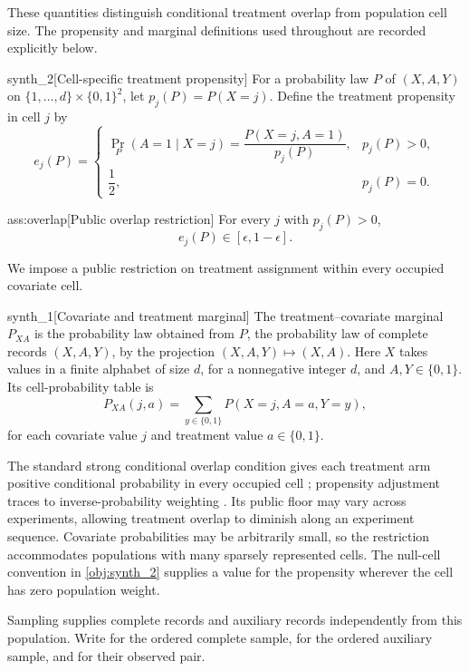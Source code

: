\documentclass[11pt]{article}
\begin{document}
These quantities distinguish conditional treatment overlap from population cell size. The propensity and marginal definitions used throughout are recorded explicitly below.

\begin{definitionv}{synth_2}[Cell-specific treatment propensity]
For a probability law \(P\) of \((X,A,Y)\) on \(\{1,\ldots,d\}\times\{0,1\}^2\), let \(p_j(P)=P(X=j)\). Define the treatment propensity in cell \(j\) by
\[
e_j(P)=
\begin{cases}
\Pr_P(A=1\mid X=j)
=\dfrac{P(X=j,A=1)}{p_j(P)},&p_j(P)>0,\\[6pt]
\dfrac12,&p_j(P)=0.
\end{cases}
\]
\end{definitionv}

\begin{assumptionv}{ass:overlap}[Public overlap restriction]
For every \(j\) with \(p_j(P)>0\),
\[
e_j(P)\in[\epsilon,1-\epsilon].
\]
\end{assumptionv}

We impose a public restriction on treatment assignment within every occupied covariate cell.

\begin{definitionv}{synth_1}[Covariate and treatment marginal]
The treatment–covariate marginal \(P_{XA}\) is the probability law obtained from \(P\), the probability law of complete records \((X,A,Y)\), by the projection \((X,A,Y)\mapsto(X,A)\). Here \(X\) takes values in a finite alphabet of size \(d\), for a nonnegative integer \(d\), and \(A,Y\in\{0,1\}\). Its cell-probability table is
\[
P_{XA}(j,a)
=
\sum_{y\in\{0,1\}} P(X=j,A=a,Y=y),
\]
for each covariate value \(j\) and treatment value \(a\in\{0,1\}\).
\end{definitionv}

The standard strong conditional overlap condition gives each treatment arm positive conditional probability in every occupied cell \citep[model (3)]{ZengBalakrishnanHanKennedy2026Discrete}; propensity adjustment traces to inverse-probability weighting \citep{Horvitz1952,Hirano2003}. Its public floor may vary across experiments, allowing treatment overlap to diminish along an experiment sequence. Covariate probabilities may be arbitrarily small, so the restriction accommodates populations with many sparsely represented cells. The null-cell convention in \cref{obj:synth_2} supplies a value for the propensity wherever the cell has zero population weight.

Sampling supplies complete records and auxiliary records independently from this population. Write  for the ordered complete sample,  for the ordered auxiliary sample, and  for their observed pair.
\end{document}
